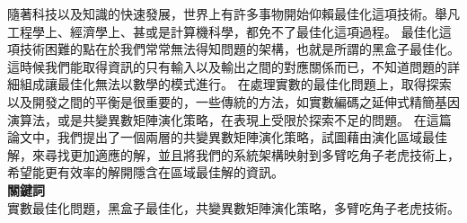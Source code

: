 \begin{abstractCH}

\setlength{\baselineskip}{1.5em}
隨著科技以及知識的快速發展，世界上有許多事物開始仰賴最佳化這項技術。舉凡工程學上、經濟學上、甚或是計算機科學，都免不了最佳化這項過程。
最佳化這項技術困難的點在於我們常常無法得知問題的架構，也就是所謂的黑盒子最佳化。這時候我們能取得資訊的只有輸入以及輸出之間的對應關係而已，不知道問題的詳細組成讓最佳化無法以數學的模式進行。
在處理實數的最佳化問題上，取得探索以及開發之間的平衡是很重要的，一些傳統的方法，如實數編碼之延伸式精簡基因演算法，或是共變異數矩陣演化策略，在表現上受限於探索不足的問題。
在這篇論文中，我們提出了一個兩層的共變異數矩陣演化策略，試圖藉由演化區域最佳解，來尋找更加適應的解，並且將我們的系統架構映射到多臂吃角子老虎技術上，希望能更有效率的解開隱含在區域最佳解的資訊。
\\

\noindent
\textbf{關鍵詞} \\
\noindent
實數最佳化問題，黑盒子最佳化，共變異數矩陣演化策略，多臂吃角子老虎技術。
\end{abstractCH}
